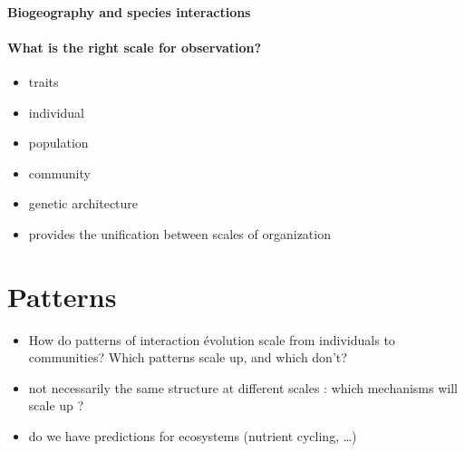 \documentclass[11pt,oneside]{article}
\begin{document}
\paragraph{Biogeography and species interactions}

\paragraph{What is the right scale for observation?}

\begin{itemize}
	\item traits
	\item individual
    \item population
    \item community
	\item genetic architecture
	\item provides the unification between scales of organization
\end{itemize}

\section{Patterns}

\begin{itemize}
    \item How do patterns of interaction \'evolution scale from individuals to
        communities? Which patterns scale up, and which don't?
    \item not necessarily the same structure at different scales : which mechanisms will scale up ?
    \item do we have predictions for ecosystems (nutrient cycling, \ldots)
\end{itemize}
\end{document}
